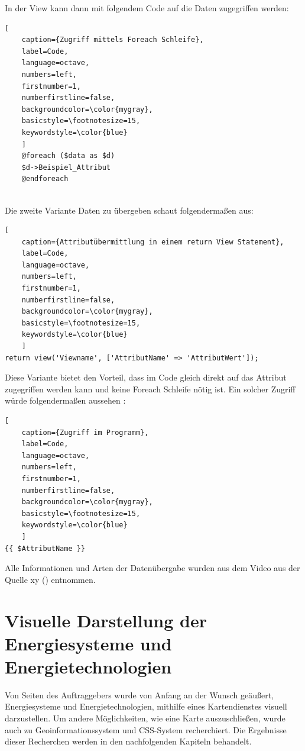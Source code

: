 In der View kann dann mit folgendem Code auf die Daten zugegriffen werden:
\renewcommand{\lstlistingname}{Quellcode}

\begin{lstlisting}[
	caption={Zugriff mittels Foreach Schleife},
	label=Code,
	language=octave,
	numbers=left,
	firstnumber=1,
	numberfirstline=false,
	backgroundcolor=\color{mygray},
	basicstyle=\footnotesize=15,
	keywordstyle=\color{blue}
	]
	@foreach ($data as $d)
	$d->Beispiel_Attribut 
	@endforeach
	
\end{lstlisting}

Die zweite Variante Daten zu übergeben schaut folgendermaßen aus:
\renewcommand{\lstlistingname}{Quellcode}

\begin{lstlisting}[
	caption={Attributübermittlung in einem return View Statement},
	label=Code,
	language=octave,
	numbers=left,
	firstnumber=1,
	numberfirstline=false,
	backgroundcolor=\color{mygray},
	basicstyle=\footnotesize=15,
	keywordstyle=\color{blue}
	]
return view('Viewname', ['AttributName' => 'AttributWert']);
\end{lstlisting}
\newpage

Diese Variante bietet den Vorteil, dass im Code gleich direkt auf das Attribut zugegriffen werden kann und keine  Foreach Schleife nötig ist. Ein solcher Zugriff würde folgendermaßen aussehen : 
\renewcommand{\lstlistingname}{Quellcode}

\begin{lstlisting}[
	caption={Zugriff im Programm},
	label=Code,
	language=octave,
	numbers=left,
	firstnumber=1,
	numberfirstline=false,
	backgroundcolor=\color{mygray},
	basicstyle=\footnotesize=15,
	keywordstyle=\color{blue}
	]
{{ $AttributName }}
\end{lstlisting}


Alle Informationen und Arten der Datenübergabe wurden aus dem Video aus der Quelle xy () entnommen.


\section {Visuelle Darstellung der Energiesysteme und Energietechnologien }
Von Seiten des Auftraggebers wurde von Anfang an der Wunsch geäußert, Energiesysteme und Energietechnologien, mithilfe eines Kartendienstes visuell darzustellen. Um andere Möglichkeiten, wie eine Karte auszuschließen, wurde auch zu Geoinformationssystem und CSS-System recherchiert. Die Ergebnisse dieser Recherchen werden in den nachfolgenden Kapiteln behandelt. 

